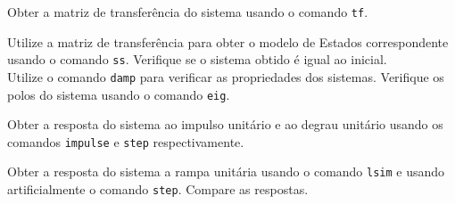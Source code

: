 \documentclass{article}
\begin{document}
\newpage\begin{exercise}\label{ex3}
    Obter a matriz de transferência do sistema usando o comando \texttt{tf}.
\end{exercise}
\begin{resolution}

\end{resolution}

\newpage\begin{exercise}\label{ex4}
    Utilize a matriz de transferência para obter o modelo de Estados correspondente usando o comando \texttt{ss}. Verifique se o sistema obtido é igual ao inicial.\\

    Utilize o comando \texttt{damp} para verificar as propriedades dos sistemas. Verifique os polos do sistema usando o comando \texttt{eig}.
\end{exercise}
\begin{resolution}

\end{resolution}

\newpage\begin{exercise}\label{ex5}
    Obter a resposta do sistema ao impulso unitário e ao degrau unitário usando os comandos \texttt{impulse} e \texttt{step} respectivamente.
\end{exercise}
\begin{resolution}

\end{resolution}

\newpage\begin{exercise}\label{ex6}
    Obter a resposta do sistema a rampa unitária usando o comando \texttt{lsim} e usando artificialmente o comando \texttt{step}. Compare as respostas.
\end{exercise}
\begin{resolution}

\end{resolution}
\end{document}
